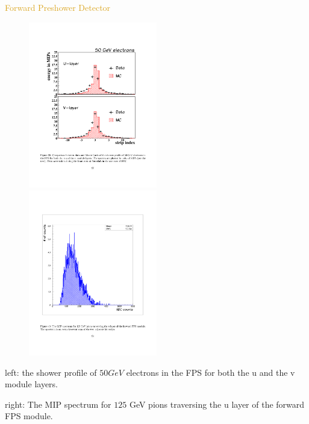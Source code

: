 \begin{frame}{\textcolor{Goldenrod}{Forward Preshower Detector}}
  \begin{overlayarea}{\textwidth}{\textheight}
    \begin{figure}[h]\centering
      \includegraphics[height=0.45\textheight, width=0.5\textwidth]{./Images/29_PS_performance.pdf}
      \includegraphics[height=0.45\textheight,width=0.5\textwidth]{./Images/29_PS_performance_01.pdf}
      
    \end{figure} 
    \itt
  \item left: the shower
    profile of $50 GeV$ electrons in the FPS for both the u and the v
    module layers.
  \item right:
    The MIP spectrum for $125$ GeV pions traversing the u layer of
    the forward FPS module.
    \tti
\end{overlayarea}
\end{frame}
